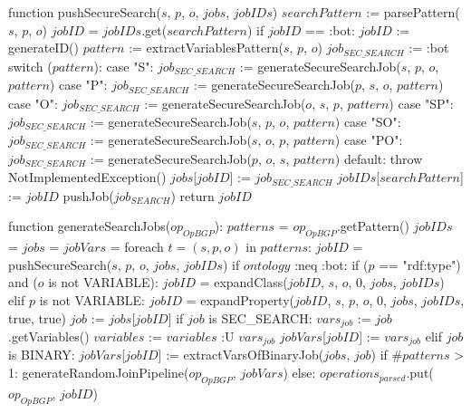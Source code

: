 function pushSecureSearch($s$, $p$, $o$, $jobs$, $jobIDs$)
    $searchPattern$ := parsePattern($s$, $p$, $o$)
    $jobID$ = $jobIDs$.get($searchPattern$)
    if $jobID$ == :bot: 
        $jobID$ := generateID()
        $pattern$ := extractVariablesPattern($s$, $p$, $o$)
        $job_{SEC\_SEARCH}$ := :bot
        switch ($pattern$):
            case "S": $job_{SEC\_SEARCH}$ := generateSecureSearchJob($s$, $p$, $o$, $pattern$)
            case "P": $job_{SEC\_SEARCH}$ := generateSecureSearchJob($p$, $s$, $o$, $pattern$)
            case "O": $job_{SEC\_SEARCH}$ := generateSecureSearchJob($o$, $s$, $p$, $pattern$)
            case "SP": $job_{SEC\_SEARCH}$ := generateSecureSearchJob($s$, $p$, $o$, $pattern$)
            case "SO": $job_{SEC\_SEARCH}$ := generateSecureSearchJob($s$, $o$, $p$, $pattern$)
            case "PO": $job_{SEC\_SEARCH}$ := generateSecureSearchJob($p$, $o$, $s$, $pattern$)
            default: throw NotImplementedException()
        $jobs$[$jobID$] := $job_{SEC\_SEARCH}$
        $jobIDs$[$searchPattern$] := $jobID$
        pushJob($job_{SEARCH}$)
    return $jobID$
 
function generateSearchJobs($op_{OpBGP}$):
    $patterns$ = $op_{OpBGP}$.getPattern()
    $jobIDs$ = {}
    $jobs$ = {}
    $jobVars$ = {}
    foreach $t = (s, p, o)$ in $patterns$:
        $jobID$ = pushSecureSearch($s$, $p$, $o$, $jobs$, $jobIDs$)
        if $ontology$ :neq :bot:
            if ($p$ == "rdf:type") and ($o$ is not VARIABLE):
                $jobID$ = expandClass($jobID$, $s$, $o$, 0, $jobs$, $jobIDs$)
            elif $p$ is not VARIABLE:
                $jobID$ = expandProperty($jobID$, $s$, $p$, $o$, 0, $jobs$, $jobIDs$, true, true)
        $job$ := $jobs$[$jobID$]
        if $job$ is SEC_SEARCH:
            $vars_{job}$ := $job$.getVariables()
            $variables$ := $variables$ :U $vars_{job}$
            $jobVars$[$jobID$] := $vars_{job}$
        elif $job$ is BINARY:
            $jobVars$[$jobID$] := extractVarsOfBinaryJob($jobs$, $job$)
    if $\#patterns$ > 1:
        generateRandomJoinPipeline($op_{OpBGP}$, $jobVars$)
    else:
        $operations_{parsed}$.put($op_{OpBGP}$, $jobID$)

